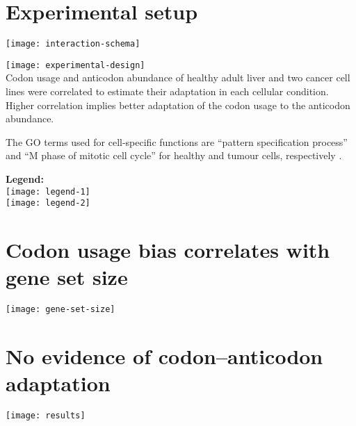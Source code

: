 \documentclass[a0,portrait]{a0poster}
\begin{document}
\section*{Experimental setup}
\vspace{-0.5cm}
\begin{minipage}{0.15\textwidth}
    \centering
    \texttt{[image: interaction-schema]}
\end{minipage}%
\hfill
\begin{minipage}[t][][t]{0.50\textwidth}
    \texttt{[image: experimental-design]}
    \\[0.5cm]
    Codon usage and anticodon abundance of healthy adult liver and two
    cancer cell lines were correlated to estimate their adaptation in each
    cellular condition. Higher correlation implies better adaptation of the
    codon usage to the anticodon abundance.

    The GO terms used for cell-specific functions are “pattern specification
    process” and “M phase of mitotic cell cycle” for healthy and tumour
    cells, respectively \citep{Gingold:2014}.
\end{minipage}%
\hfill
\begin{minipage}{0.23\textwidth}
    \centering
    \textbf{Legend:}\\[0.5cm]
    \texttt{[image: legend-1]}
    \\[2cm]
    \texttt{[image: legend-2]}
\end{minipage}%

\vspace{1cm}
\noindent
\begin{minipage}[t][][t]{0.48\textwidth}
    \section*{Codon usage bias correlates with gene set size}
    \texttt{[image: gene-set-size]}
\end{minipage}%
\hfill
\begin{minipage}[t][][t]{0.48\textwidth}
    \section*{No evidence of codon--anticodon adaptation}
    \texttt{[image: results]}
\end{minipage}%

\vspace{-0.5cm}
\end{document}

